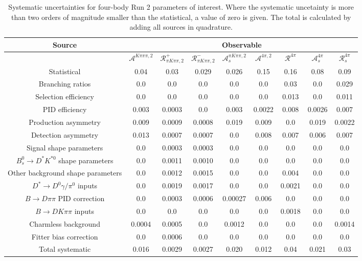 \begin{sidewaystable}
  \centering
  \begin{tabular}{ccccccccc}
      \toprule
      Source & \multicolumn{8}{c}{Observable} \\
      \midrule
       & $\mathcal{A}^{K\pi\pi\pi,2}$ & $\mathcal{R}_{\pi K\pi\pi,2}^+$ & $\mathcal{R}_{\pi K\pi\pi,2}^-$ & $\mathcal{A}_s^{\pi K\pi\pi,2}$ & $\mathcal{A}^{4\pi,2}$ & $\mathcal{R}^{4\pi}$ & $\mathcal{A}_s^{4\pi}$ & $\mathcal{R}_{s}^{4\pi}$ \\
      \midrule
      Statistical & 0.04 & 0.03 & 0.029 & 0.026 & 0.15 & 0.16 & 0.08 & 0.09 \\
      \midrule
      Branching ratios & 0.0  & 0.0  & 0.0  & 0.0  & 0.0  & 0.03 & 0.0  & 0.029 \\
      Selection efficiency & 0.0  & 0.0  & 0.0  & 0.0  & 0.0  & 0.013 & 0.0  & 0.011 \\
      PID efficiency & 0.003 & 0.0003 & 0.0  & 0.003 & 0.0022 & 0.008 & 0.0026 & 0.007 \\
      Production asymmetry & 0.009 & 0.0009 & 0.0008 & 0.019 & 0.009 & 0.0  & 0.019 & 0.0022 \\
      Detection asymmetry & 0.013 & 0.0007 & 0.0007 & 0.0  & 0.008 & 0.007 & 0.006 & 0.007 \\
      Signal shape parameters & 0.0  & 0.0003 & 0.0003 & 0.0  & 0.0  & 0.0  & 0.0  & 0.0  \\
      $B^0_s \to D^* K^{*0}$ shape parameters & 0.0  & 0.0011 & 0.0010 & 0.0  & 0.0  & 0.0  & 0.0  & 0.0  \\
      Other background shape parameters & 0.0  & 0.0012 & 0.0015 & 0.0  & 0.0  & 0.004 & 0.0  & 0.0  \\
      $D^* \to D^0 \gamma/\pi^0$ inputs & 0.0  & 0.0019 & 0.0017 & 0.0  & 0.0  & 0.0021 & 0.0  & 0.0  \\
      $B\to D\pi\pi$ PID correction & 0.0  & 0.0003 & 0.0006 & 0.00027 & 0.006 & 0.0  & 0.0  & 0.0  \\
      $B\to DK\pi\pi$ inputs & 0.0  & 0.0  & 0.0  & 0.0  & 0.0  & 0.0018 & 0.0  & 0.0  \\
      Charmless background & 0.0004 & 0.0005 & 0.0  & 0.0012 & 0.0  & 0.0  & 0.0  & 0.0014 \\
      Fitter bias correction & 0.0  & 0.0006 & 0.0  & 0.0  & 0.0  & 0.0  & 0.0  & 0.0  \\
      \midrule
      Total systematic & 0.016 & 0.0029 & 0.0027 & 0.020 & 0.012 & 0.04 & 0.021 & 0.03 \\
      \bottomrule
  \end{tabular}
  \caption{Systematic uncertainties for four-body Run 2 parameters of interest. Where the systematic uncetainty is more than two orders of magnitude smaller than the statistical, a value of zero is given. The total is calculated by adding all sources in quadrature.}
\label{tab:fourBody_run2_systematics}
\end{sidewaystable}
